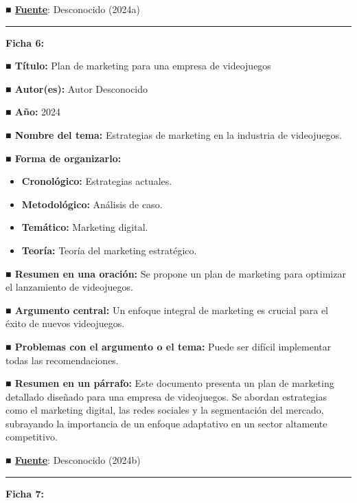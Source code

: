\documentclass[
  letterpaper,
  DIV=11,
  numbers=noendperiod]{scrreprt}
\begin{document}
\textbf{■
\href{https://riunet.upv.es/bitstream/handle/10251/45702/Trabajo\%20final\%20carrera.pdf}{Fuente}}:
Desconocido (2024a)

\begin{center}\rule{0.5\linewidth}{0.5pt}\end{center}

\textbf{Ficha 6:}

\textbf{■ Título:} Plan de marketing para una empresa de videojuegos

\textbf{■ Autor(es):} Autor Desconocido

\textbf{■ Año:} 2024

\textbf{■ Nombre del tema:} Estrategias de marketing en la industria de
videojuegos.

\textbf{■ Forma de organizarlo:}

\begin{itemize}
\item
  \textbf{Cronológico:} Estrategias actuales.
\item
  \textbf{Metodológico:} Análisis de caso.
\item
  \textbf{Temático:} Marketing digital.
\item
  \textbf{Teoría:} Teoría del marketing estratégico.
\end{itemize}

\textbf{■ Resumen en una oración:} Se propone un plan de marketing para
optimizar el lanzamiento de videojuegos.

\textbf{■ Argumento central:} Un enfoque integral de marketing es
crucial para el éxito de nuevos videojuegos.

\textbf{■ Problemas con el argumento o el tema:} Puede ser difícil
implementar todas las recomendaciones.

\textbf{■ Resumen en un párrafo:} Este documento presenta un plan de
marketing detallado diseñado para una empresa de videojuegos. Se abordan
estrategias como el marketing digital, las redes sociales y la
segmentación del mercado, subrayando la importancia de un enfoque
adaptativo en un sector altamente competitivo.

\textbf{■
\href{https://bdigital.uncu.edu.ar/objetos_digitales/15654/plan-de-marketing-para-una-empresa-de-videojuegos.pdf}{Fuente}}:
Desconocido (2024b)

\begin{center}\rule{0.5\linewidth}{0.5pt}\end{center}

\textbf{Ficha 7:}
\end{document}

